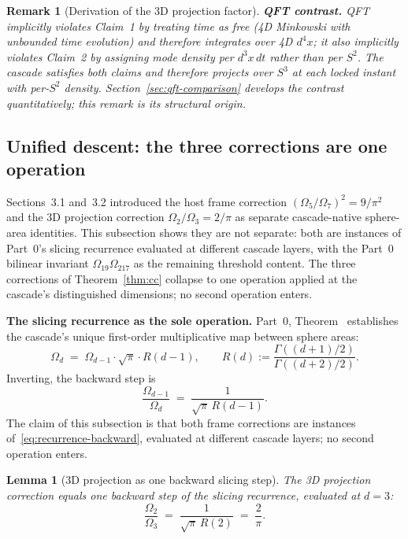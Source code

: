 \documentclass[11pt,a4paper]{article}
\newtheorem{lemma}[theorem]{Lemma}
\newtheorem{remark}[theorem]{Remark}
\begin{document}
\begin{remark}[Derivation of the 3D projection factor]
\medskip\noindent\textbf{QFT contrast.} QFT implicitly violates
Claim~1 by treating time as free (4D Minkowski with unbounded time
evolution) and therefore integrates over 4D $d^4x$; it also
implicitly violates Claim~2 by assigning mode density per
$d^3\!x\,d t$ rather than per $S^2$. The cascade satisfies both
claims and therefore projects over $S^3$ at each locked instant with
per-$S^2$ density. Section~\ref{sec:qft-comparison} develops the
contrast quantitatively; this remark is its structural origin.
\end{remark}

\subsection{Unified descent: the three corrections are one operation}
\label{subsec:unified-descent}

Sections~3.1 and~3.2 introduced the host frame correction
$(\Omega_5/\Omega_7)^2 = 9/\pi^2$ and the 3D projection correction
$\Omega_2/\Omega_3 = 2/\pi$ as separate cascade-native sphere-area
identities. This subsection shows they are not separate: both are
instances of Part~0's slicing recurrence evaluated at different
cascade layers, with the Part~0 bilinear invariant
$\Omega_{19}\Omega_{217}$ as the remaining threshold content. The
three corrections of Theorem~\ref{thm:cc} collapse to one operation
applied at the cascade's distinguished dimensions; no second operation
enters.

\medskip\noindent\textbf{The slicing recurrence as the sole operation.}
Part~0, Theorem~ establishes the cascade's unique first-order
multiplicative map between sphere areas:
\begin{equation}\label{eq:recurrence-forward}
\Omega_d \;=\; \Omega_{d-1}\cdot\sqrt{\pi}\cdot R(d-1),
\qquad R(d) := \frac{\Gamma((d+1)/2)}{\Gamma((d+2)/2)}.
\end{equation}
Inverting, the backward step is
\begin{equation}\label{eq:recurrence-backward}
\frac{\Omega_{d-1}}{\Omega_d} \;=\; \frac{1}{\sqrt{\pi}\,R(d-1)}.
\end{equation}
The claim of this subsection is that both frame corrections are
instances of~\eqref{eq:recurrence-backward}, evaluated at different
cascade layers; no second operation enters.

\begin{lemma}[3D projection as one backward slicing step]\label{lem:projection-step}
The 3D projection correction equals one backward step of the slicing
recurrence, evaluated at $d=3$:
\[
\frac{\Omega_2}{\Omega_3}
\;=\; \frac{1}{\sqrt{\pi}\,R(2)}
\;=\; \frac{2}{\pi}.
\]
\end{lemma}
\end{document}
